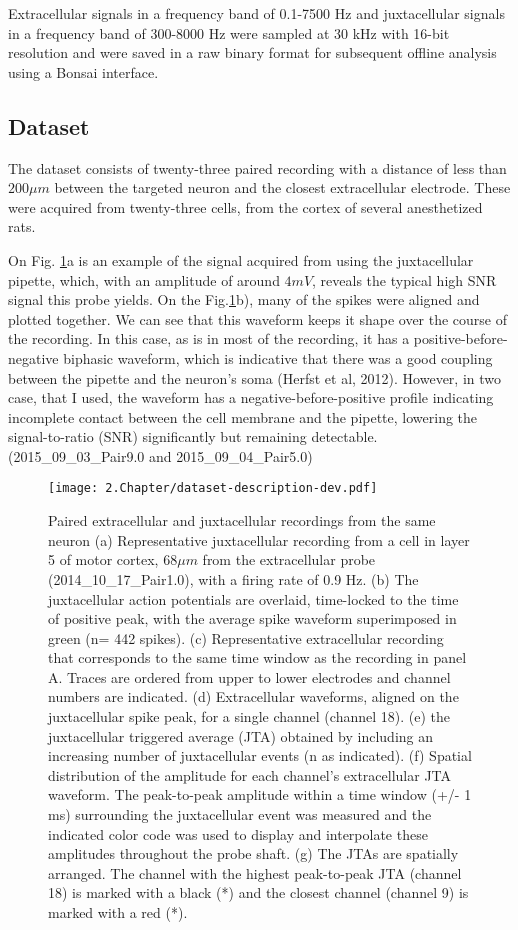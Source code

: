 Extracellular signals in a frequency band of 0.1-7500 Hz and juxtacellular signals in a frequency band of 300-8000 Hz were sampled at 30 kHz with 16-bit resolution and were saved in a raw binary format for subsequent offline analysis using a Bonsai interface. \cite{bonsai2015}


\subsection{Dataset}
\label{subsec:Netodataset}
The dataset consists of twenty-three paired recording with a distance of less than $200 \mu m$ between the targeted neuron and the closest extracellular electrode. These were acquired from twenty-three cells, from the cortex of several anesthetized rats.

On Fig. \ref{fig:neto-data-description}a is an example of the signal acquired from using the juxtacellular pipette, which, with an amplitude of around $4mV$, reveals the typical high SNR  signal this probe yields. On the Fig.\ref{fig:neto-data-description}b), many of the spikes were aligned and  plotted together. We can see that this waveform keeps it shape over the course of the recording. In this case, as is in most of the recording, it has a positive-before-negative biphasic waveform, which is indicative that there was a good coupling between the pipette and the neuron's soma (Herfst et al, 2012). However, in two case, that I used, the waveform has a negative-before-positive profile indicating incomplete contact between the cell membrane and the pipette, lowering the signal-to-ratio (SNR) significantly but remaining detectable. (2015\_09\_03\_Pair9.0 and 2015\_09\_04\_Pair5.0)

\begin{figure}[!h]
	\centering
	\texttt{[image: 2.Chapter/dataset-description-dev.pdf]}
	\caption{Paired extracellular and juxtacellular recordings from the same neuron
(a) Representative juxtacellular recording from a cell in layer 5 of motor cortex, $68 \mu m$ from the extracellular probe (2014\_10\_17\_Pair1.0), with a firing rate of 0.9 Hz. (b) The juxtacellular action potentials are overlaid, time-locked to the time of positive peak, with the average spike waveform superimposed in green (n= 442 spikes). (c) Representative extracellular recording that corresponds to the same time window as the recording in panel A. Traces are ordered from upper to lower electrodes and channel numbers are indicated. (d) Extracellular waveforms, aligned on the juxtacellular spike peak, for a single channel (channel 18). (e) the juxtacellular triggered average (JTA) obtained by including an increasing number of juxtacellular events (n as indicated). (f) Spatial distribution of the amplitude for each channel’s extracellular JTA waveform. The peak-to-peak amplitude within a time window (+/- 1 ms) surrounding the juxtacellular event was measured and the indicated color code was used to display and interpolate these amplitudes throughout the probe shaft. (g) The JTAs are spatially arranged. The channel with the highest peak-to-peak JTA (channel 18) is marked with a black (*) and the closest channel (channel 9) is marked with a red (*).
}
\label{fig:neto-data-description}
\end{figure}

